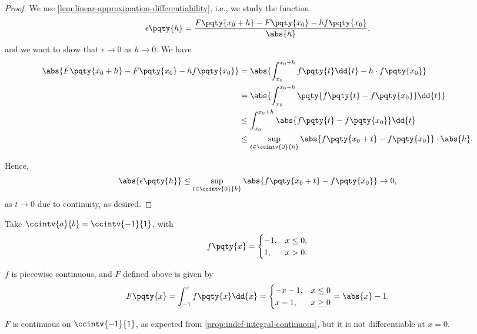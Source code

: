 \begin{proof}
    We use \autoref{lem:linear-approximation-differentiability}, i.e., we study the function
    \[
        \epsilon\pqty{h} = \frac{F\pqty{x_0 + h} - F\pqty{x_0} - h f\pqty{x_0}}{\abs{h}},
    \]
    and we want to show that \(\epsilon \to 0\) as \(h \to 0\). We have
    \begin{align*}
        \abs{F\pqty{x_0 + h} - F\pqty{x_0} - h f\pqty{x_0}} &= \abs{\int_{x_0}^{x_0 + h} f\pqty{t} \dd{t} - h \cdot f\pqty{x_0}} \\
        &= \abs{\int_{x_0}^{x_0 + h} \pqty{f\pqty{t} - f\pqty{x_0}} \dd{t}} \\
        &\leq \int_{x_0}^{x_0 + h} \abs{f\pqty{t} - f\pqty{x_0}} \dd{t} \\
        &\leq \sup_{t \in \ccintv{0}{h}} \abs{f\pqty{x_0 + t} - f\pqty{x_0}} \cdot \abs{h}.
    \end{align*}

    Hence,
    \[
        \abs{\epsilon\pqty{h}} \leq \sup_{t \in \ccintv{0}{h}} \abs{f\pqty{x_0 + t} - f\pqty{x_0}} \to 0,
    \]
    as \(t \to 0\) due to continuity, as desired.
\end{proof}

\begin{example}
    \label{ex:non-differentiable-indefinite-integral}%
    Take \(\ccintv{a}{b} = \ccintv{-1}{1}\), with
    \[
        f\pqty{x} = \begin{cases}
            -1, & x \leq 0, \\
            1, & x > 0.
        \end{cases}
    \]

    \(f\) is piecewise continuous, and \(F\) defined above is given by
    \[
        F\pqty{x} = \int_{-1}^{x} f\pqty{x} \dd{x} = \begin{cases}
            -x - 1, & x \leq 0 \\
            x - 1, & x \geq 0
        \end{cases}
        = \abs{x} - 1.
    \]

    \(F\) is continuous on \(\ccintv{-1}{1}\), as expected from \autoref{prop:indef-integral-continuous}, but it is not differentiable at \(x = 0\).
\end{example}

